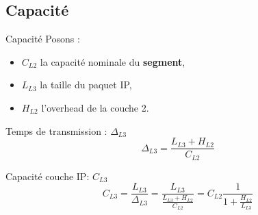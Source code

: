\documentclass[compress]{beamer}
\begin{document}
\subsection{Capacité}
\begin{frame}{Capacité}
	Posons :
	\begin{itemize}
	\item $C_{L2}$ la capacité nominale du \textbf{segment},
	\item $L_{L3}$ la taille du paquet IP, 
	\item $H_{L2}$ l'overhead de la couche 2. 
	\end{itemize}
	\begin{block}{Temps de transmission : $\Delta_{L3}$}
		$$\Delta_{L3} = \frac{L_{L3} + H_{L2}}{C_{L2}}$$
	\end{block}
	\begin{block}{Capacité couche IP:  $C_{L3}$}
		$$C_{L3} = \frac{L_{L3}}{\Delta_{L3}} = \frac{L_{L3}}{\frac{L_{L3}+H_{L2}}{C_{L2}}} = C_{L2} \frac{1}{1+\frac{H_{L2}}{L_{L3}}}$$
	\end{block}
\end{frame}
\end{document}
